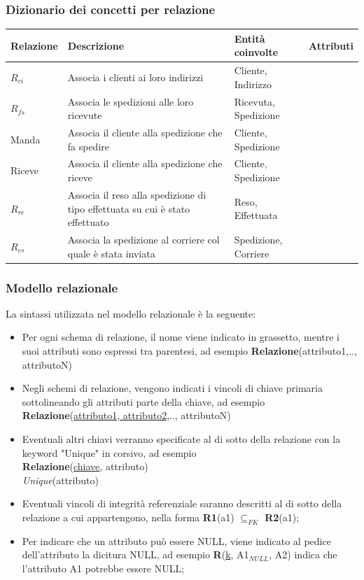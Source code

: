 \subsubsection*{Dizionario dei concetti per relazione}
\begin{table}[H]
	\centering
	\begin{tabularx}{\dimexpr{}\arrayrulewidth}{|*{4}{Y|}} %
		\hline
		\textbf{Relazione} & \textbf{Descrizione} & \textbf{Entità coinvolte} & \textbf{Attributi} \\ \hline
		$R_{ci}$ & Associa i clienti ai loro indirizzi & Cliente, Indirizzo & \\ 
    \hline
    $R_{fs}$ & Associa le spedizioni alle loro ricevute & Ricevuta, Spedizione & \\
    \hline
    Manda & Associa il cliente alla spedizione che fa spedire & Cliente, Spedizione & \\
    \hline 
    Riceve & Associa il cliente alla spedizione che riceve & Cliente, Spedizione & \\
    \hline
    $R_{re}$ & Associa il reso alla spedizione di tipo effettuata su cui è stato effettuato & Reso, Effettuata & \\
    \hline
    $R_{cs}$ & Associa la spedizione al corriere col quale è stata inviata & Spedizione, Corriere & \\ 
    \hline
	\end{tabularx}
\end{table}

\subsubsection{Modello relazionale}
La sintassi utilizzata nel modello relazionale è la seguente:
\begin{itemize}
  \item Per ogni schema di relazione, il nome viene indicato in grassetto, mentre i suoi attributi sono espressi tra parentesi, ad esempio \textbf{Relazione}(attributo1,.., attributoN)
  \item Negli schemi di relazione, vengono indicati i vincoli di chiave primaria sottolineando gli attributi parte della chiave, ad esempio \textbf{Relazione}(\underline{attributo1, attributo2},.., attributoN)
  \item Eventuali altri chiavi verranno specificate al di sotto della relazione con la keyword "Unique" in corsivo, ad esempio \\ \textbf{Relazione}(\underline{chiave}, attributo)\\ \textit{Unique}(attributo)
  \item Eventuali vincoli di integrità referenziale saranno descritti al di sotto della relazione a cui appartengono, nella forma \textbf{R1}(a1) $\subseteq _{FK}$ \textbf{R2}(a1);
  \item Per indicare che un attributo può essere NULL, viene indicato al pedice dell'attributo la dicitura NULL, ad esempio \textbf{R}(\underline{k}, A1$_{NULL}$, A2) indica che l'attributo A1 potrebbe essere NULL;
\end{itemize}

